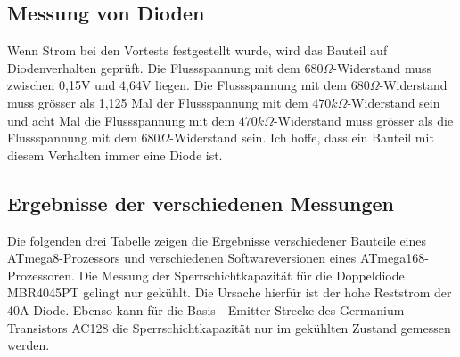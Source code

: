 \subsection{Messung von Dioden}
\label{sec:diode}
Wenn Strom bei den Vortests festgestellt wurde, wird das Bauteil auf Diodenverhalten geprüft.
Die Flussspannung mit dem \(680\Omega\)-Widerstand muss zwischen 0,15V und 4,64V liegen.
Die Flussspannung mit dem \(680\Omega\)-Widerstand muss grösser als 1,125 Mal der Flussspannung mit dem
 \(470k\Omega\)-Widerstand sein und acht Mal die Flussspannung mit dem \(470k\Omega\)-Widerstand muss
grösser als die Flussspannung mit dem \(680\Omega\)-Widerstand sein.
Ich hoffe, dass ein Bauteil mit diesem Verhalten immer eine Diode ist.

\subsection{Ergebnisse der verschiedenen Messungen}
Die folgenden drei Tabelle zeigen die Ergebnisse verschiedener Bauteile 
eines ATmega8-Prozessors und verschiedenen Softwareversionen eines ATmega168-Prozessoren.
Die Messung der Sperrschichtkapazität für die Doppeldiode MBR4045PT gelingt
nur gekühlt. Die Ursache hierfür ist der hohe Reststrom der 40A Diode. Ebenso kann für die Basis - Emitter
Strecke des Germanium Transistors AC128 die Sperrschichtkapazität nur im
gekühlten Zustand gemessen werden. 

